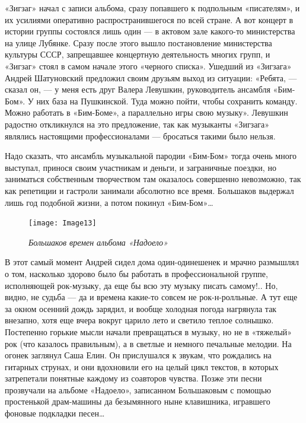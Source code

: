 \documentclass[16pt,a5paper,oneside]{book}
\begin{document}
«Зигзаг» начал с записи альбома, сразу попавшего к подпольным «писателям», и их усилиями оперативно распространившегося
по всей стране. А вот концерт в истории группы состоялся лишь один — в актовом зале какого-то министерства на улице
Лубянке. Сразу после этого вышло постановление министерства культуры СССР, запрещавшее концертную деятельность многих
групп, и «Зигзаг» стоял в самом начале этого «черного списка». Ушедший из «Зигзага» Андрей Шатуновский предложил своим
друзьям выход из ситуации: «Ребята, — сказал он, — у меня есть друг Валера Левушкин, руководитель ансамбля «Бим-Бом». У
них база на Пушкинской. Туда можно пойти, чтобы сохранить команду. Можно работать в «Бим-Боме», а параллельно игры свою
музыку». Левушкин радостно откликнулся на это предложение, так как музыканты «Зигзага» являлись настоящими
профессионалами — бросаться такими было нельзя.

Надо сказать, что ансамбль музыкальной пародии «Бим-Бом» тогда очень много выступал, принося своим участникам и деньги,
и заграничные поездки, но заниматься собственным творчеством там оказалось совершенно невозможно, так как репетиции и
гастроли занимали абсолютно все время. Большаков выдержал лишь год подобной жизни, а потом покинул «Бим-Бом»\ldots

\begin{figure}
    \centering
    \texttt{[image: Image13]}
    \caption{\textit{Большаков времен альбома «Надоело»}}
\end{figure}

В этот самый момент Андрей сидел дома один-одинешенек и мрачно размышлял о том, насколько здорово было бы работать в
профессиональной группе, исполняющей рок-музыку, да еще бы всю эту музыку писать самому!.. Но, видно, не судьба — да и
времена какие-то совсем не рок-н-ролльные. А тут еще за окном осенний дождь зарядил, и вообще холодная погода нагрянула
так внезапно, хотя еще вчера вокруг царило лето и светило теплое солнышко. Постепенно горькие мысли начали превращаться
в музыку, но не в «тяжелый» рок (что казалось правильным), а в светлые и немного печальные мелодии. На огонек заглянул
Саша Елин. Он прислушался к звукам, что рождались на гитарных струнах, и они вдохновили его на целый цикл текстов, в
которых затрепетали понятные каждому из соавторов чувства. Позже эти песни прозвучали на альбоме «Надоело», записанном
Большаковым с помощью простенькой драм-машины да безымянного ныне клавишника, игравшего фоновые подкладки песен\ldots
\end{document}
